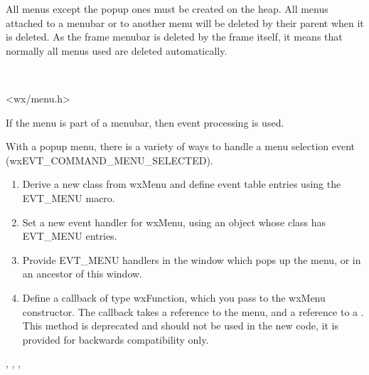 
All menus except the popup ones must be created on the heap. All menus
attached to a menubar or to another menu will be deleted by their parent when
it is deleted. As the frame menubar is deleted by the frame itself, it means
that normally all menus used are deleted automatically.


\\


<wx/menu.h>


If the menu is part of a menubar, then  event processing is used.

With a popup menu, there is a variety of ways to handle a menu selection event
(wxEVT\_COMMAND\_MENU\_SELECTED).

\begin{enumerate}\itemsep=0pt
\item Derive a new class from wxMenu and define event table entries using the EVT\_MENU macro.
\item Set a new event handler for wxMenu, using an object whose class has EVT\_MENU entries.
\item Provide EVT\_MENU handlers in the window which pops up the menu, or in an ancestor of
this window.
\item Define a callback of type wxFunction, which you pass to the wxMenu constructor.
The callback takes a reference to the menu, and a reference to a
. This method is deprecated and should
not be used in the new code, it is provided for backwards compatibility only.
\end{enumerate}


, ,\rtfsp
{},\rtfsp
{}





\label{wxmenuctor}


